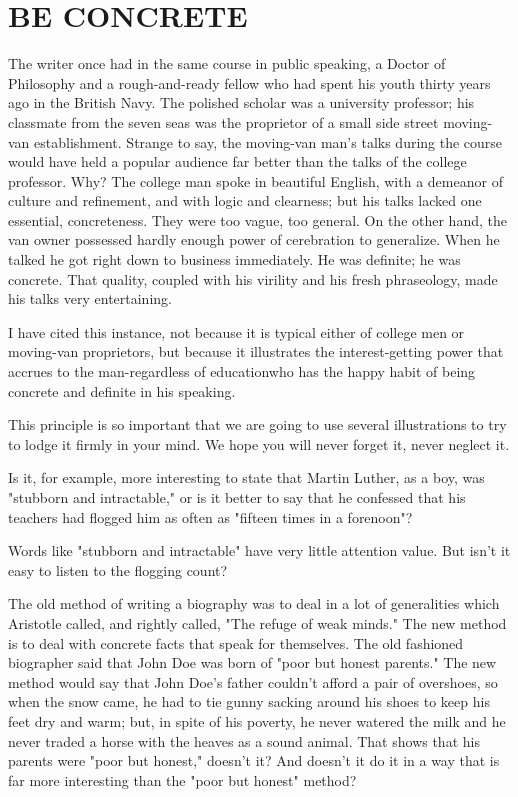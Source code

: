 \documentclass[10pt]{article}
\begin{document}
\section*{BE CONCRETE}
The writer once had in the same course in public speaking, a Doctor of Philosophy and a rough-and-ready fellow who had spent his youth thirty years ago in the British Navy. The polished scholar was a university professor; his classmate from the seven seas was the proprietor of a small side street moving-van establishment. Strange to say, the moving-van man's talks during the course would have held a popular audience far better than the talks of the college professor. Why? The college man spoke in beautiful English, with a demeanor of culture and refinement, and with logic and clearness; but his talks lacked one essential, concreteness. They were too vague, too general. On the other hand, the van owner possessed hardly enough power of cerebration to generalize. When he talked he got right down to business immediately. He was definite; he was concrete. That quality, coupled with his virility and his fresh phraseology, made his talks very entertaining.

I have cited this instance, not because it is typical either of college men or moving-van proprietors, but because it illustrates the interest-getting power that accrues to the man-regardless of educationwho has the happy habit of being concrete and definite in his speaking.

This principle is so important that we are going to use several illustrations to try to lodge it firmly in your mind. We hope you will never forget it, never neglect it.

Is it, for example, more interesting to state that Martin Luther, as a boy, was "stubborn and intractable," or is it better to say that he confessed that his teachers had flogged him as often as "fifteen times in a forenoon"?

Words like "stubborn and intractable" have very little attention value. But isn't it easy to listen to the flogging count?

The old method of writing a biography was to deal in a lot of generalities which Aristotle called, and rightly called, "The refuge of weak minds." The new method is to deal with concrete facts that speak for themselves. The old fashioned biographer said that John Doe was born of "poor but honest parents." The new method would say that John Doe's father couldn't afford a pair of overshoes, so when the snow came, he had to tie gunny sacking around his shoes to keep his feet dry and warm; but, in spite of his poverty, he never watered the milk and he never traded a horse with the heaves as a sound animal. That shows that his parents were "poor but honest," doesn't it? And doesn't it do it in a way that is far more interesting than the "poor but honest" method?
\end{document}
